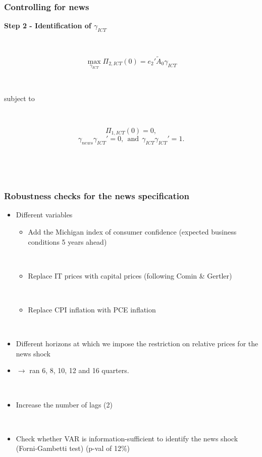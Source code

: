 \documentclass{beamer}
\begin{document}
\begin{frame}
	\frametitle{Controlling for news}
\textbf{Step 2 - Identification of $\gamma_{ICT}$} 	

\

$$
\max_{\gamma_{ICT}} \Pi_{2,ICT}(0) =  e_2' \tilde{A}_0 \gamma_{ICT} 
$$

\

subject to

\

$$
\Pi_{1,ICT}(0) = 0,
$$
$$
\gamma_{news} \gamma_{ICT}' = 0, \ \ \text{and} \ \ \gamma_{ICT} \gamma_{ICT}' = 1.
$$


\

\
	
\hyperlink{robustness_checks}{}	
\end{frame}



\begin{frame}
	\frametitle{Robustness checks for the news specification}

\begin{itemize}
\item Different variables
	\begin{itemize}
	\item Add the Michigan index of consumer confidence (expected business conditions 5 years ahead)
	
	
	\
	
	\item Replace IT prices with capital prices (following Comin \& Gertler)
	
	\
	
	\item Replace CPI inflation with PCE inflation
	\end{itemize}
	
	\
	
\item Different horizons at which we impose the restriction on relative prices for the news shock
\item[] $\rightarrow$ ran  6, 8, 10, 12 and 16 quarters.

\

\item Increase the number of lags (2)

\

\item Check whether VAR is information-sufficient to identify the news shock (Forni-Gambetti test) (p-val of 12\%)
\end{itemize}

\

\hyperlink{robustness_checks}{}	

   		 	
\end{frame}
\end{document}
